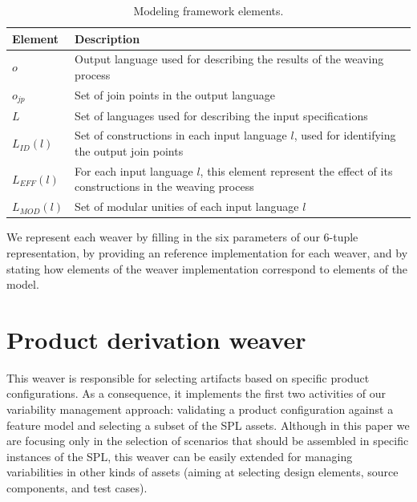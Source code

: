 \documentclass[11pt]{report}
\begin{document}
\begin{table}[h]
\begin{center}
 \caption{Modeling framework elements.} \label{tab:tup-01}
\begin{tabular}{|p{0.6in}|p{2.4in}|}
  \hline
  {\bf Element} & {\bf Description} \\ 
   \hline
  $o$              & Output language used for describing the results of the weaving process \\ \hline
  $o_{jp}$       & Set of join points in the output language \\ \hline
  $L$              & Set of languages used for describing the input specifications \\ \hline
  $L_{ID}(l)$      & Set of constructions in each input language $l$, used for identifying the output join points \\ \hline 
  $L_{EFF}(l)$   & For each input language $l$, this element represent the effect of its constructions in the weaving process \\ \hline
  $L_{MOD}(l)$  & Set of modular unities of each input language $l$\\ \hline
  \hline
\end{tabular}
\end{center}
\end{table}

We represent each weaver by 
filling in the six parameters of our 6-tuple representation, by providing an reference implementation for each 
weaver, and by stating how elements of the weaver implementation correspond to elements of the model.

\section{Product derivation weaver}\label{sub:pd-weaver}

This weaver is responsible for selecting artifacts based on specific product configurations. 
As a consequence, it implements the first two activities of our variability management approach: 
validating a product configuration against  a feature model and selecting a subset of the SPL assets. 
Although in this paper we are focusing only in the selection of scenarios that should be assembled in specific instances 
of the SPL, this weaver can be easily extended for managing variabilities in other kinds of assets (aiming at selecting design elements, source components, and test cases). 
\end{document}
